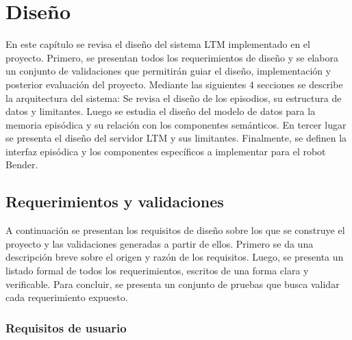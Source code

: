 \chapter{Diseño}\label{chapter:diseno}


En este capítulo se revisa el diseño del sistema LTM implementado en el proyecto. Primero, se presentan todos los requerimientos de diseño y se elabora un conjunto de validaciones que permitirán guiar el diseño, implementación y posterior evaluación del proyecto. Mediante las siguientes 4 secciones se describe la arquitectura del sistema: Se revisa el diseño de los episodios, su estructura de datos y limitantes. Luego se estudia el diseño del modelo de datos para la memoria episódica y su relación con los componentes semánticos. En tercer lugar se presenta el diseño del servidor LTM y sus limitantes. Finalmente, se definen la interfaz episódica y los componentes específicos a implementar para el robot Bender.




\section{Requerimientos y validaciones}

A continuación se presentan los requisitos de diseño sobre los que se construye el proyecto y las validaciones generadas a partir de ellos. Primero se da una descripción breve sobre el origen y razón de los requisitos. Luego, se presenta un listado formal de todos los requerimientos, escritos de una forma clara y verificable. Para concluir, se presenta un conjunto de pruebas que busca validar cada requerimiento expuesto.
 
\subsection{Requisitos de usuario}



